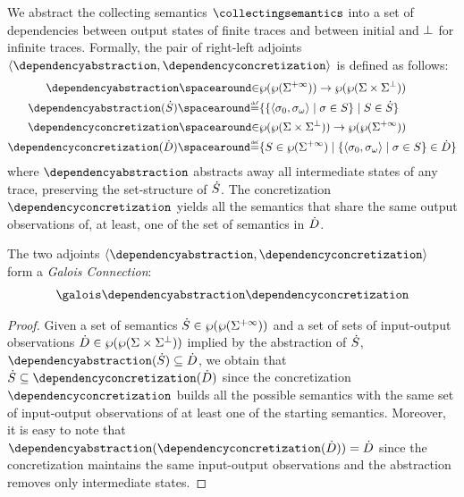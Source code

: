 We abstract the collecting semantics $\collectingsemantics$ into a set of dependencies between output states of finite traces and between initial and $\bot$ for infinite traces.
Formally, the pair of right-left adjoints $\tuple{\dependencyabstraction}{\dependencyconcretization}$ is defined as follows:
%
\begin{align*}
  \dependencyabstraction \IN& \collectingtype \to \dependencytype \\
  \dependencyabstraction(\defsetofsetoftraces) \DefeQ& \setdef{
    \setdef{\inputoutputtuple{\defseq}}{\defseq\in\defsetoftraces}
  }{
    \defsetoftraces\in\defsetofsetoftraces
  }\\
  \dependencyconcretization \IN& \dependencytype \to \collectingtype \\
  \dependencyconcretization(\defsetofsetofdependencies) \DefeQ& \setdef{
    \defsetoftraces\in\setof\finiteinfinitesequences
  }{
    \setdef{\inputoutputtuple\defseq}{\defseq\in\defsetoftraces} \in \defsetofsetofdependencies
  }
\end{align*}
where $\dependencyabstraction$ abstracts away all intermediate states of any trace, preserving the set-structure of $\dot{S}$.
The concretization $\dependencyconcretization$ yields all the semantics that share the same output observations of, at least, one of the set of semantics in $\dot{D}$.


\begin{theorem}
The two adjoints $\tuple{\dependencyabstraction}{\dependencyconcretization}$ form a \emph{Galois Connection}:
\begin{align*}
  \galoisbetweensemantics{collecting}{dependency}
\end{align*}
\end{theorem}
\begin{proof}
  Given a set of semantics $\dot{S}\in\wp(\wp(\Sigma^{+\infty}))$ and a set of sets of input-output observations $\dot{D}\in\wp(\wp(\Sigma\times\Sigma^\bot))$ implied by the abstraction of $\dot{S}$, $\dependencyabstraction(\defsetofsetoftraces)\subseteq \defsetofsetofdependencies$, we obtain that $\defsetofsetoftraces\subseteq\dependencyconcretization(\defsetofsetofdependencies)$ since the concretization $\dependencyconcretization$ builds all the possible semantics with the same set of input-output observations of at least one of the starting semantics.
  Moreover, it is easy to note that $\dependencyabstraction(\dependencyconcretization(\defsetofsetofdependencies)) = \defsetofsetofdependencies$ since the concretization maintains the same input-output observations and the abstraction removes only intermediate states.
\end{proof}

